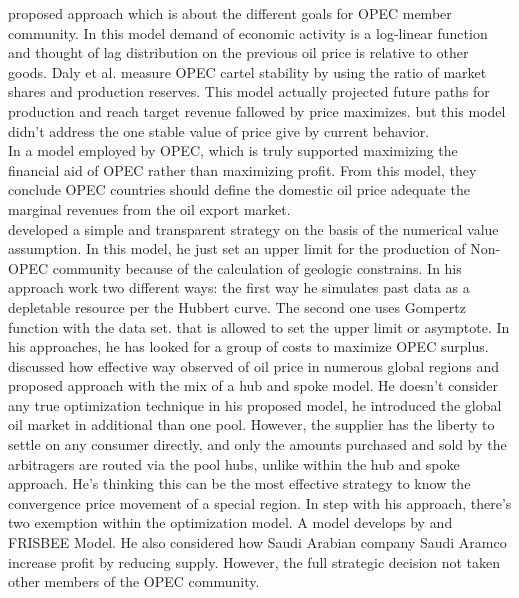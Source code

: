 \cite{daly1982recent} proposed approach which is about the different goals for OPEC member community. In this model demand of economic activity is a log-linear function and thought of lag distribution on the previous oil price is relative to other goods. Daly et al. measure OPEC cartel stability by using the ratio of market shares and production reserves. This model actually projected future paths for production and reach target revenue fallowed by price maximizes. but this model didn't address the one stable value of price give by current behavior.\\


In \cite{celta2000opec} a model employed by OPEC, which is truly supported maximizing the financial aid of OPEC rather than maximizing profit. From this model, they conclude OPEC countries should define the domestic oil price adequate the marginal revenues from the oil export market.\\

\cite{horn2004opec} developed a simple and transparent strategy on the basis of the numerical value assumption. In this model, he just set an upper limit for the production of Non-OPEC community because of the calculation of geologic constrains. In his approach work two different ways: the first way he simulates past data as a depletable resource per the Hubbert curve. The second one uses Gompertz function with the data set. that is allowed to set the upper limit or asymptote. In his approaches, he has looked for a group of costs to maximize OPEC surplus. \\

\cite{huppmann2012crude} discussed how effective way observed of oil price in numerous global regions and proposed approach with the mix of a hub and spoke model. He doesn't consider any true optimization technique in his proposed model, he introduced the global oil market in additional than one pool. However, the supplier has the liberty to settle on any consumer directly, and only the amounts purchased and sold by the arbitragers are routed via the pool hubs, unlike within the hub and spoke approach. He's thinking this can be the most effective strategy to know the convergence price movement of a special region. In step with his approach, there's two exemption within the optimization model. A model develops by \cite{al2008model} and FRISBEE Model. He also considered how Saudi Arabian company Saudi Aramco increase profit by reducing supply. However, the full strategic decision not taken other members of the OPEC community.

